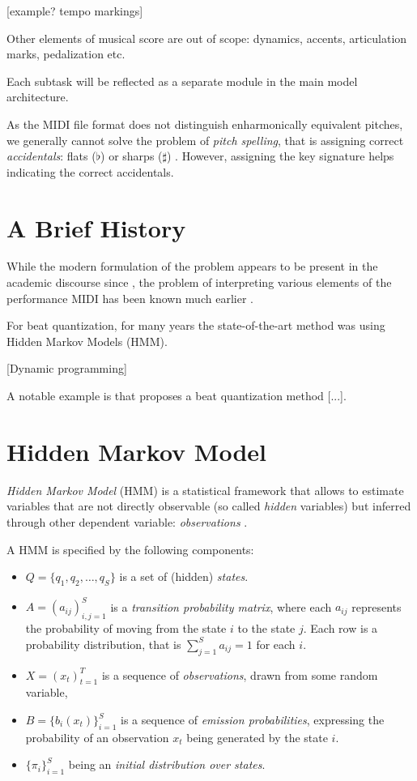 [example? tempo markings]

Other elements of musical score are out of scope: dynamics, accents, articulation marks, pedalization etc.

Each subtask will be reflected as a separate module in the main model architecture.

As the MIDI file format does not distinguish enharmonically  equivalent pitches, we generally cannot solve the problem  of \emph{pitch spelling}, that is assigning correct \emph{accidentals}: flats ($\flat$) or sharps ($\sharp$) \cite{Cambouropoulos2000}. However, assigning the key signature helps indicating the correct accidentals.

\section{A Brief History}

While the modern formulation of the problem appears to be present in the academic discourse since \cite{Cogliati2016}, the problem of interpreting various elements of the performance MIDI has been known much earlier \cite{Cambouropoulos2000}.

For beat quantization, for many years the state-of-the-art method was using Hidden Markov Models (HMM). \cite{Takeda2002}

[Dynamic programming]

A notable example is \cite{Grohganz2014} that proposes a beat quantization method [...].

\section{Hidden Markov Model}

\emph{Hidden Markov Model} (HMM) is a statistical framework that allows to estimate variables that are not directly observable (so called \emph{hidden} variables) but inferred through other dependent variable: \emph{observations} \cite[p. 210--213]{Jurafsky2009}.

A HMM is specified by the following components: \begin{itemize}
	\item $Q=\{q_1,q_2,\ldots, q_S\}$ is a set of (hidden) \emph{states}.
	\item $A=(a_{ij})_{i,j=1}^S$ is a \emph{transition probability matrix}, where each $a_{ij}$ represents the probability of moving from the state $i$ to the state $j$. Each row is a probability distribution, that is $\sum_{j=1}^S a_{ij}=1$ for each $i$.
	\item $X=(x_t)_{t=1}^T$ is a sequence of \emph{observations}, drawn from some random variable,
	\item $B=\{b_i(x_t)\}_{i=1}^S$ is a sequence of \emph{emission probabilities}, expressing the probability of an observation $x_t$ being generated by the state $i$.
	\item $\{\pi_i\}_{i=1}^S$ being an \emph{initial distribution over states}.
\end{itemize}


